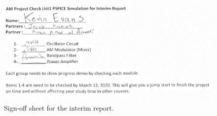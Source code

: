 \documentclass[11pt,letter,notitlepage]{article}
\begin{document}
	\begin{figure}[h]
		\centering
		\includegraphics[width=\linewidth]{signoff}
		\caption{Sign-off sheet for the interim report.}
		\label{fig:signoff}
	\end{figure}
	
\end{document}
